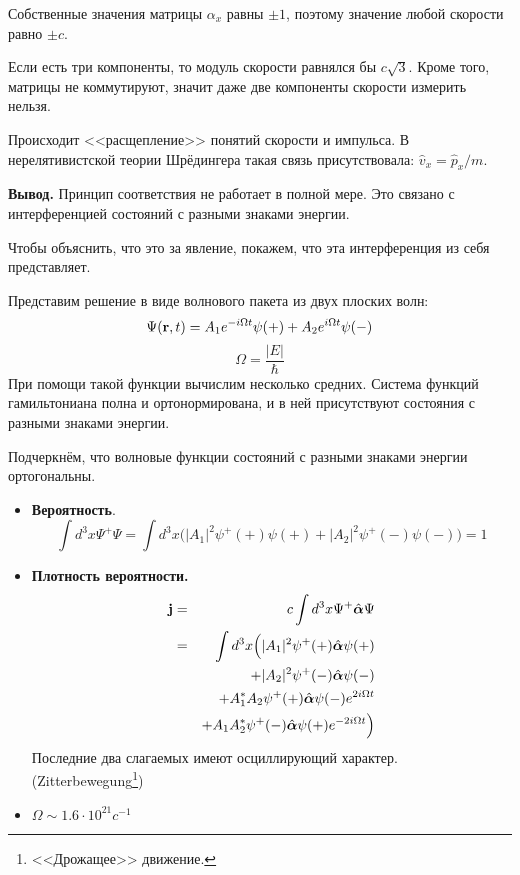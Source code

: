 Собственные значения матрицы $\alpha_x$ равны $\pm 1$, поэтому значение любой скорости равно $\pm c$.

Если есть три компоненты, то модуль скорости равнялся бы $c \sqrt{3}$. Кроме того, матрицы не коммутируют, значит даже две компоненты скорости измерить нельзя.

Происходит <<расщепление>> понятий скорости и импульса. В нерелятивистской теории Шрёдингера такая связь присутствовала: $\hat v_x = \hat p_x / m$.

\textbf{Вывод.}  Принцип соответствия не работает в полной мере. Это связано с интерференцией состояний с разными знаками энергии.

Чтобы объяснить, что это за явление, покажем, что эта интерференция из себя представляет.

Представим решение в виде волнового пакета из двух плоских волн:
$$
    \Psi(\bf r, t) = A_1 e^{-i \Omega t} \psi(+) + A_2 e^{i \Omega t} \psi(-)
$$
$$
    \Omega = \dfrac{|E|}{\hbar}
$$
При помощи такой функции вычислим несколько средних. Система функций гамильтониана полна и ортонормирована, и в ней присутствуют состояния с разными знаками энергии.

Подчеркнём, что волновые функции состояний с разными знаками энергии ортогональны.

\begin{itemize}
  \item \textbf{Вероятность}.
  $$
    \int d^3 x \Psi ^+ \Psi = \int d^3 x \Big(
        |A_1|^2 \psi^+(+) \psi(+) + |A_2|^2 \psi^+(-) \psi(-)
    \Big) = 1
  $$
  \item \textbf{Плотность вероятности.}
  \begin{eqnarray*}
    \bf j &=& c \int d^3 x \Psi^+ \hat{\boldsymbol \alpha} \Psi\\
    &=& \int d^3 x
    \Big(
        |A_1|^2 \psi^+ (+) \hat{\boldsymbol \alpha} \psi(+)\\ &&+
        |A_2|^2 \psi^+ (-) \hat{\boldsymbol \alpha} \psi(-)\\ &&+
        A_1^{\ast} A_2 \psi^+(+) \hat {\boldsymbol \alpha} \psi(-) e^{2i \Omega t}\\
        &&+ A_1 A_2^{\ast} \psi^+(-) \hat {\boldsymbol \alpha} \psi(+) e^{-2i \Omega t}
    \Big)
  \end{eqnarray*}
  Последние два слагаемых имеют осциллирующий характер. (Zitterbewegung\footnote{<<Дрожащее>> движение.})
  
  \item $\Omega \sim 1.6 \cdot 10^{21} c^{-1}$
\end{itemize}

